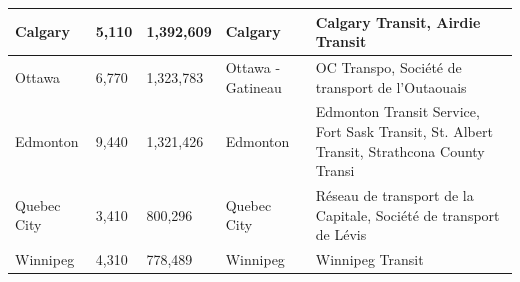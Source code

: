 \documentclass[11 pt, letterpaper]{article}
\begin{document}
{\begin{table}
\begin{adjustwidth}{-.25in}{-.25in}
\begin{singlespace}
\begin{tabular}{L{19mm}L{10mm}L{17mm}L{33mm}L{60mm}}
			Calgary     & 5,110  & 1,392,609    & Calgary                                                                                               & Calgary Transit, Airdie Transit                                                                                                                                                                                                                                                                                                                                                                                                           \\ \hline
			Ottawa      & 6,770  & 1,323,783    & Ottawa - Gatineau                                                                                     & OC Transpo, Société de transport de l'Outaouais                                                                                                                                                                                                                                                                                                                                                                                           \\ \hline
			Edmonton    & 9,440  & 1,321,426    & Edmonton                                                                                              & Edmonton Transit Service, Fort Sask Transit, St. Albert Transit, Strathcona County Transi                                                                                                                                                                                                                                                                                                                                                 \\ \hline
			Quebec City & 3,410  & 800,296     & Quebec City                                                                                           & Réseau de transport de la Capitale, Société de transport de Lévis                                                                                                                                                                                                                                                                                                                                                                         \\ \hline
			Winnipeg    & 4,310  & 778,489     & Winnipeg                                                                                              & Winnipeg Transit                                                                                                                                                                                                                                                                                                                                                                                                                         

\end{tabular}
\end{singlespace}
\end{adjustwidth}
\end{table}}
\end{document}
